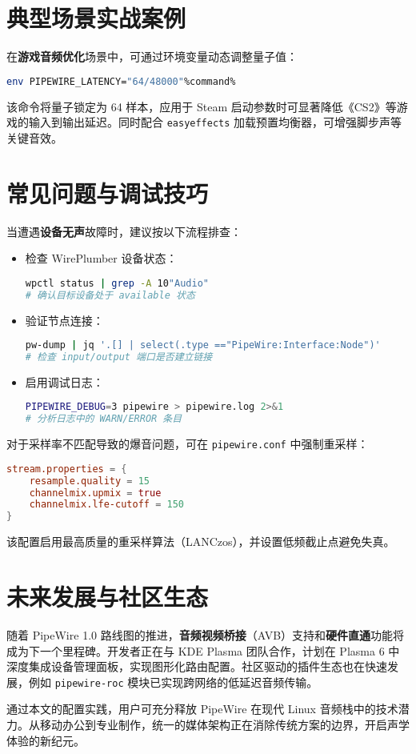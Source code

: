 \chapter{典型场景实战案例}
在\textbf{游戏音频优化}场景中，可通过环境变量动态调整量子值：\par
\begin{lstlisting}[language=bash]
env PIPEWIRE_LATENCY="64/48000"%command%
\end{lstlisting}
该命令将量子锁定为 64 样本，应用于 Steam 启动参数时可显著降低《CS2》等游戏的输入到输出延迟。同时配合 \verb!easyeffects! 加载预置均衡器，可增强脚步声等关键音效。\par
\chapter{常见问题与调试技巧}
当遭遇\textbf{设备无声}故障时，建议按以下流程排查：\par
\begin{itemize}
\item 检查 WirePlumber 设备状态：\begin{lstlisting}[language=bash]
wpctl status | grep -A 10"Audio"
# 确认目标设备处于 available 状态
\end{lstlisting}

\item 验证节点连接：\begin{lstlisting}[language=bash]
pw-dump | jq '.[] | select(.type =="PipeWire:Interface:Node")'
# 检查 input/output 端口是否建立链接
\end{lstlisting}

\item 启用调试日志：\begin{lstlisting}[language=bash]
PIPEWIRE_DEBUG=3 pipewire > pipewire.log 2>&1
# 分析日志中的 WARN/ERROR 条目
\end{lstlisting}

\end{itemize}
对于采样率不匹配导致的爆音问题，可在 \verb!pipewire.conf! 中强制重采样：\par
\begin{lstlisting}[language=conf]
stream.properties = {
    resample.quality = 15
    channelmix.upmix = true
    channelmix.lfe-cutoff = 150
}
\end{lstlisting}
该配置启用最高质量的重采样算法（LANCzos），并设置低频截止点避免失真。\par
\chapter{未来发展与社区生态}
随着 PipeWire 1.0 路线图的推进，\textbf{音频视频桥接}（AVB）支持和\textbf{硬件直通}功能将成为下一个里程碑。开发者正在与 KDE Plasma 团队合作，计划在 Plasma 6 中深度集成设备管理面板，实现图形化路由配置。社区驱动的插件生态也在快速发展，例如 \verb!pipewire-roc! 模块已实现跨网络的低延迟音频传输。\par
通过本文的配置实践，用户可充分释放 PipeWire 在现代 Linux 音频栈中的技术潜力。从移动办公到专业制作，统一的媒体架构正在消除传统方案的边界，开启声学体验的新纪元。\par
